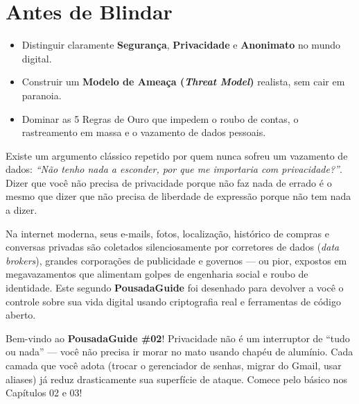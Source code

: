 \documentclass{pousadaguide}
\begin{document}
\capa
\tableofcontents

\chapter{Antes de Blindar}

\begin{missao}
\begin{itemize}
  \item Distinguir claramente \textbf{Segurança}, \textbf{Privacidade} e \textbf{Anonimato} no mundo digital.
  \item Construir um \textbf{Modelo de Ameaça (\emph{Threat Model})} realista, sem cair em paranoia.
  \item Dominar as 5 Regras de Ouro que impedem o roubo de contas, o rastreamento em massa e o vazamento de dados pessoais.
\end{itemize}
\end{missao}

Existe um argumento clássico repetido por quem nunca sofreu um vazamento de dados: \emph{``Não tenho nada a esconder, por que me importaria com privacidade?''}. Dizer que você não precisa de privacidade porque não faz nada de errado é o mesmo que dizer que não precisa de liberdade de expressão porque não tem nada a dizer.

Na internet moderna, seus e-mails, fotos, localização, histórico de compras e conversas privadas são coletados silenciosamente por corretores de dados (\emph{data brokers}), grandes corporações de publicidade e governos — ou pior, expostos em megavazamentos que alimentam golpes de engenharia social e roubo de identidade. Este segundo \textbf{PousadaGuide} foi desenhado para devolver a você o controle sobre sua vida digital usando criptografia real e ferramentas de código aberto.

\begin{pousadinha}
Bem-vindo ao \textbf{PousadaGuide \#02}! Privacidade não é um interruptor de ``tudo ou nada'' — você não precisa ir morar no mato usando chapéu de alumínio. Cada camada que você adota (trocar o gerenciador de senhas, migrar do Gmail, usar aliases) já reduz drasticamente sua superfície de ataque. Comece pelo básico nos Capítulos 02 e 03!
\end{pousadinha}
\end{document}
